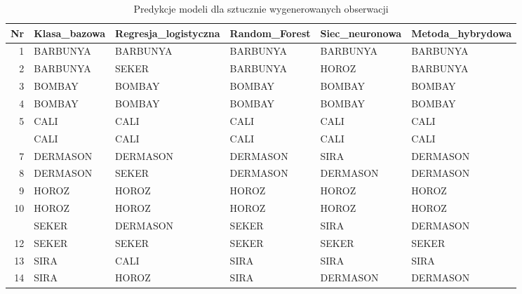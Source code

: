 \begin{table}[H]

\caption{\label{tab:synthetic-predictions}Predykcje modeli dla sztucznie wygenerowanych obserwacji}
\centering
\begin{tabular}[t]{rlllll}
\toprule
Nr & Klasa\_bazowa & Regresja\_logistyczna & Random\_Forest & Siec\_neuronowa & Metoda\_hybrydowa\\
\midrule
1 & BARBUNYA & BARBUNYA & BARBUNYA & BARBUNYA & BARBUNYA\\
2 & BARBUNYA & SEKER & BARBUNYA & HOROZ & BARBUNYA\\
3 & BOMBAY & BOMBAY & BOMBAY & BOMBAY & BOMBAY\\
4 & BOMBAY & BOMBAY & BOMBAY & BOMBAY & BOMBAY\\
5 & CALI & CALI & CALI & CALI & CALI\\
\addlinespace
6 & CALI & CALI & CALI & CALI & CALI\\
7 & DERMASON & DERMASON & DERMASON & SIRA & DERMASON\\
8 & DERMASON & SEKER & DERMASON & DERMASON & DERMASON\\
9 & HOROZ & HOROZ & HOROZ & HOROZ & HOROZ\\
10 & HOROZ & HOROZ & HOROZ & HOROZ & HOROZ\\
\addlinespace
11 & SEKER & DERMASON & SEKER & SIRA & DERMASON\\
12 & SEKER & SEKER & SEKER & SEKER & SEKER\\
13 & SIRA & CALI & SIRA & SIRA & SIRA\\
14 & SIRA & HOROZ & SIRA & DERMASON & DERMASON\\
\bottomrule
\end{tabular}
\end{table}
